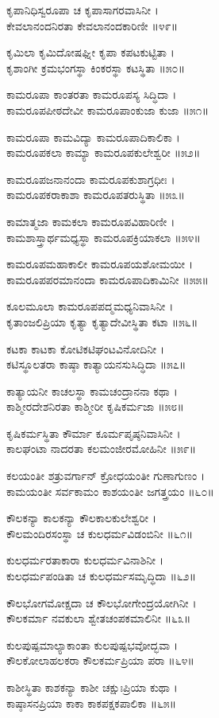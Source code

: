 ಕೃಪಾನಿಧಿಸ್ವರೂಪಾ ಚ ಕೃಪಾಸಾಗರವಾಸಿನೀ ।\\
ಕೇವಲಾನಂದನಿರತಾ ಕೇವಲಾನಂದಕಾರಿಣೀ ॥೪೯॥

ಕೃಮಿಲಾ ಕೃಮಿದೋಷಘ್ನೀ ಕೃಪಾ ಕಪಟಕುಟ್ಟಿತಾ ।\\
ಕೃಶಾಂಗೀ ಕ್ರಮಭಂಗಸ್ಥಾ ಕಿಂಕರಸ್ಥಾ ಕಟಸ್ಥಿತಾ ॥೫೦॥

ಕಾಮರೂಪಾ ಕಾಂತರತಾ ಕಾಮರೂಪಸ್ಯ ಸಿದ್ಧಿದಾ ।\\
ಕಾಮರೂಪಪೀಠದೇವೀ ಕಾಮರೂಪಾಂಕುಜಾ ಕುಜಾ ॥೫೧॥

ಕಾಮರೂಪಾ ಕಾಮವಿದ್ಯಾ ಕಾಮರೂಪಾದಿಕಾಲಿಕಾ ।\\
ಕಾಮರೂಪಕಲಾ ಕಾಮ್ಯಾ ಕಾಮರೂಪಕುಲೇಶ್ವರೀ ॥೫೨॥

ಕಾಮರೂಪಜನಾನಂದಾ ಕಾಮರೂಪಕುಶಾಗ್ರಧೀಃ ।\\
ಕಾಮರೂಪಕರಾಕಾಶಾ ಕಾಮರೂಪತರುಸ್ಥಿತಾ ॥೫೩॥

ಕಾಮಾತ್ಮಜಾ ಕಾಮಕಲಾ ಕಾಮರೂಪವಿಹಾರಿಣೀ ।\\
ಕಾಮಶಾಸ್ತ್ರಾರ್ಥಮಧ್ಯಸ್ಥಾ ಕಾಮರೂಪಕ್ರಿಯಾಕಲಾ ॥೫೪॥

ಕಾಮರೂಪಮಹಾಕಾಲೀ ಕಾಮರೂಪಯಶೋಮಯೀ ।\\
ಕಾಮರೂಪಪರಮಾನಂದಾ ಕಾಮರೂಪಾದಿಕಾಮಿನೀ ॥೫೫॥

ಕೂಲಮೂಲಾ ಕಾಮರೂಪಪದ್ಮಮಧ್ಯನಿವಾಸಿನೀ ।\\
ಕೃತಾಂಜಲಿಪ್ರಿಯಾ ಕೃತ್ಯಾ ಕೃತ್ಯಾದೇವೀಸ್ಥಿತಾ ಕಟಾ ॥೫೬॥

ಕಟಕಾ ಕಾಟಕಾ ಕೋಟಿಕಟಿಘಂಟವಿನೋದಿನೀ ।\\
ಕಟಿಸ್ಥೂಲತರಾ ಕಾಷ್ಠಾ ಕಾತ್ಯಾಯನಸುಸಿದ್ಧಿದಾ ॥೫೭॥

ಕಾತ್ಯಾಯನೀ ಕಾಚಲಸ್ಥಾ ಕಾಮಚಂದ್ರಾನನಾ ಕಥಾ ।\\
ಕಾಶ್ಮೀರದೇಶನಿರತಾ ಕಾಶ್ಮೀರೀ ಕೃಷಿಕರ್ಮಜಾ ॥೫೮॥

ಕೃಷಿಕರ್ಮಸ್ಥಿತಾ ಕೌರ್ಮಾ ಕೂರ್ಮಪೃಷ್ಠನಿವಾಸಿನೀ ।\\
ಕಾಲಘಂಟಾ ನಾದರತಾ ಕಲಮಂಜೀರಮೋಹಿನೀ ॥೫೯॥

ಕಲಯಂತೀ ಶತ್ರುವರ್ಗಾನ್ ಕ್ರೋಧಯಂತೀ ಗುಣಾಗುಣಂ ।\\
ಕಾಮಯಂತೀ ಸರ್ವಕಾಮಂ ಕಾಶಯಂತೀ ಜಗತ್ತ್ರಯಂ ॥೬೦॥

ಕೌಲಕನ್ಯಾ ಕಾಲಕನ್ಯಾ ಕೌಲಕಾಲಕುಲೇಶ್ವರೀ ।\\
ಕೌಲಮಂದಿರಸಂಸ್ಥಾ ಚ ಕುಲಧರ್ಮವಿಡಂಬಿನೀ ॥೬೧॥

ಕುಲಧರ್ಮರತಾಕಾರಾ ಕುಲಧರ್ಮವಿನಾಶಿನೀ ।\\
ಕುಲಧರ್ಮಪಂಡಿತಾ ಚ ಕುಲಧರ್ಮಸಮೃದ್ಧಿದಾ ॥೬೨॥

ಕೌಲಭೋಗಮೋಕ್ಷದಾ ಚ ಕೌಲಭೋಗೇಂದ್ರಯೋಗಿನೀ ।\\
ಕೌಲಕರ್ಮಾ ನವಕುಲಾ ಶ್ವೇತಚಂಪಕಮಾಲಿನೀ ॥೬೩॥

ಕುಲಪುಷ್ಪಮಾಲ್ಯಾಕಾಂತಾ ಕುಲಪುಷ್ಪಭವೋದ್ಭವಾ ।\\
ಕೌಲಕೋಲಾಹಲಕರಾ ಕೌಲಕರ್ಮಪ್ರಿಯಾ ಪರಾ ॥೬೪॥

ಕಾಶೀಸ್ಥಿತಾ ಕಾಶಕನ್ಯಾ ಕಾಶೀ ಚಕ್ಷುಃಪ್ರಿಯಾ ಕುಥಾ ।\\
ಕಾಷ್ಠಾಸನಪ್ರಿಯಾ ಕಾಕಾ ಕಾಕಪಕ್ಷಕಪಾಲಿಕಾ ॥೬೫॥

